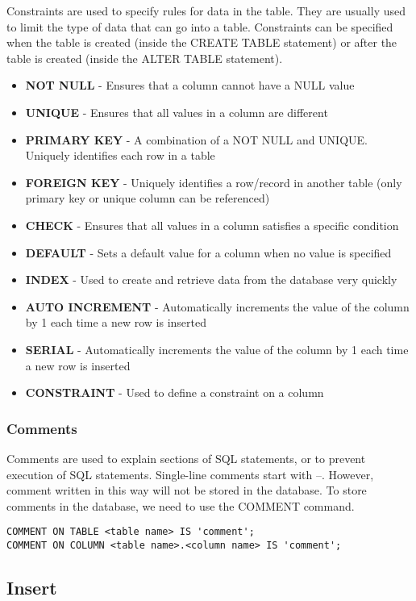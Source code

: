 \documentclass[a4paper,12pt]{article}
\begin{document}
Constraints are used to specify rules for data in the table.
They are usually used to limit the type of data that can go into a table.
Constraints can be specified when the table is created (inside the CREATE TABLE statement) or after the table is created (inside the ALTER TABLE statement).
\begin{itemize}
	\item \textbf{NOT NULL} - Ensures that a column cannot have a NULL value
	\item \textbf{UNIQUE} - Ensures that all values in a column are different
	\item \textbf{PRIMARY KEY} - A combination of a NOT NULL and UNIQUE. Uniquely identifies each row in a table
	\item \textbf{FOREIGN KEY} - Uniquely identifies a row/record in another table (only primary key or unique column can be referenced)
	\item \textbf{CHECK} - Ensures that all values in a column satisfies a specific condition
	\item \textbf{DEFAULT} - Sets a default value for a column when no value is specified
	\item \textbf{INDEX} - Used to create and retrieve data from the database very quickly
	\item \textbf{AUTO INCREMENT} - Automatically increments the value of the column by 1 each time a new row is inserted
	\item \textbf{SERIAL} - Automatically increments the value of the column by 1 each time a new row is inserted
	\item \textbf{CONSTRAINT} - Used to define a constraint on a column
\end{itemize}

\subsubsection{Comments}

Comments are used to explain sections of SQL statements, or to prevent execution of SQL statements.
Single-line comments start with --.
However, comment written in this way will not be stored in the database.
To store comments in the database, we need to use the COMMENT command.
\begin{verbatim}
COMMENT ON TABLE <table name> IS 'comment';
COMMENT ON COLUMN <table name>.<column name> IS 'comment';
\end{verbatim}

\subsection{Insert}
\end{document}
